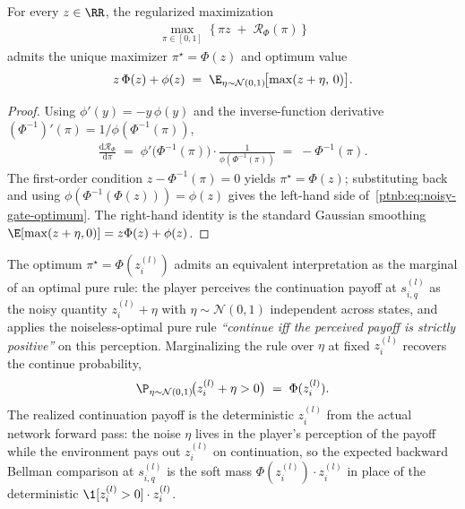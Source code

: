 \begin{lemmaenv}\label{ptnb:lem:noisy-gate-dual}
For every $z\in\RR$, the regularized maximization
\begin{align}\label{ptnb:eq:noisy-gate-objective}
    \max_{\pi \in [0,1]}\; \bigl\{\,\pi z \;+\; \mathcal{R}_\Phi(\pi)\,\bigr\}
\end{align}
admits the unique maximizer $\pi^\star = \Phi(z)$ and optimum value
\begin{align}\label{ptnb:eq:noisy-gate-optimum}
    z\,\Phi(z) + \phi(z) \;=\; \E_{\eta\sim\mathcal{N}(0,1)}\!\bigl[\max(z+\eta,\,0)\bigr].
\end{align}
\hfill{}
\end{lemmaenv}

\begin{proof}
Using $\phi'(y) = -y\,\phi(y)$ and the inverse-function derivative $(\Phi^{-1})'(\pi) =
    1/\phi(\Phi^{-1}(\pi))$,
\begin{align}\label{ptnb:eq:noisy-gate-deriv}
    \frac{\mathrm{d}\mathcal{R}_\Phi}{\mathrm{d}\pi}
    \;=\; \phi'\!\bigl(\Phi^{-1}(\pi)\bigr) \cdot \frac{1}{\phi(\Phi^{-1}(\pi))}
    \;=\; -\Phi^{-1}(\pi).
\end{align}
The first-order condition $z - \Phi^{-1}(\pi) = 0$ yields $\pi^\star = \Phi(z)$; substituting back
and using $\phi(\Phi^{-1}(\Phi(z))) = \phi(z)$ gives the left-hand side
of~\eqref{ptnb:eq:noisy-gate-optimum}. The right-hand identity is the standard Gaussian smoothing
$\E[\max(z+\eta,0)] = z\Phi(z) + \phi(z)$.
\end{proof}

\begin{remark}\label{ptnb:rem:noisy-gate-perception}
The optimum $\pi^\star = \Phi(z_i^{(l)})$ admits an equivalent interpretation as the marginal of an
optimal pure rule: the player perceives the continuation payoff at $s_{i,q}^{(l)}$ as the noisy
quantity $z_i^{(l)} + \eta$ with $\eta \sim \mathcal{N}(0,1)$ independent across states, and
applies the noiseless-optimal pure rule \emph{``continue iff the perceived payoff is strictly
positive''} on this perception. Marginalizing the rule over $\eta$ at fixed $z_i^{(l)}$ recovers
the continue probability,
\begin{align}\label{ptnb:eq:noisy-gate-marginal}
    \P_{\eta\sim\mathcal{N}(0,1)}\!\bigl(z_i^{(l)} + \eta > 0\bigr) \;=\; \Phi(z_i^{(l)}).
\end{align}
The realized continuation payoff is the deterministic $z_i^{(l)}$ from the actual network forward
pass: the noise $\eta$ lives in the player's perception of the payoff while the environment pays
out $z_i^{(l)}$ on continuation, so the expected backward Bellman comparison at $s_{i,q}^{(l)}$ is
the soft mass $\Phi(z_i^{(l)}) \cdot z_i^{(l)}$ in place of the deterministic $\1[z_i^{(l)} >
    0]\cdot z_i^{(l)}$.
\end{remark}

